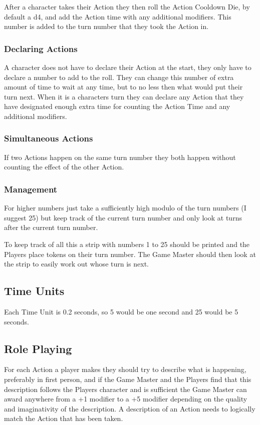 \documentclass[a4paper,12pt,oneside]{book}
\begin{document}
                    After a character takes their Action they then roll the Action Cooldown Die, by default a d4, and add the Action time with any additional modifiers. This number is added to the turn number that they took the Action in.

                \subsubsection{Declaring Actions}
                    A character does not have to declare their Action at the start, they only have to declare a number to add to the roll. They can change this number of extra amount of time to wait at any time, but to no less then what would put their turn next. When it is a characters turn they can declare any Action that they have designated enough extra time for counting the Action Time and any additional modifiers.

                \subsubsection{Simultaneous Actions}
                    If two Actions happen on the same turn number they both happen without counting the effect of the other Action.

                \subsubsection{Management}
                    For higher numbers just take a sufficiently high modulo of the turn numbers (I suggest 25) but keep track of the current turn number and only look at turns after the current turn number.

                    To keep track of all this a strip with numbers 1 to 25 should be printed and the Players place tokens on their turn number. The Game Master should then look at the strip to easily work out whose turn is next.

                \subsection{Time Units}
                    Each Time Unit is 0.2 seconds, so 5 would be one second and 25 would be 5 seconds.

            \subsection{Role Playing}
                For each Action a player makes they should try to describe what is happening, preferably in first person, and if the Game Master and the Players find that this description follows the Players character and is sufficient the Game Master can award anywhere from a +1 modifier to a +5 modifier depending on the quality and imaginativity of the description. A description of an Action needs to logically match the Action that has been taken.
\end{document}
